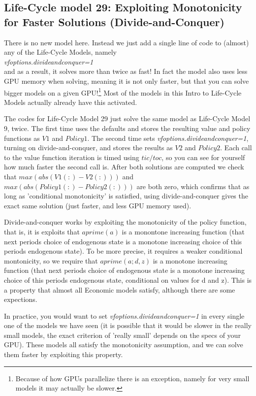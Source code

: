 \subsection{Life-Cycle model 29: Exploiting Monotonicity for Faster Solutions (Divide-and-Conquer)}
There is no new model here. Instead we just add a single line of code to (almost) any of the Life-Cycle Models, namely
\\ \textit{vfoptions.divideandconquer=1}
\\ \noindent and as a result, it solves more than twice as fast! In fact the model also uses less GPU memory when solving, meaning it is not only faster, but that you can solve bigger models on a given GPU!\footnote{Because of how GPUs parallelize there is an exception, namely for very small models it may actually be slower.} Most of the models in this Intro to Life-Cycle Models actually already have this activated.

The codes for Life-Cycle Model 29 just solve the same model as Life-Cycle Model 9, twice. The first time uses the defaults and stores the resulting value and policy functions as $V1$ and $Policy1$. The second time sets \textit{vfoptions.divideandconquer=1}, turning on divide-and-conquer, and stores the results as $V2$ and $Policy2$. Each call to the value function iteration is timed using $tic/toc$, so you can see for yourself how much faster the second call is. After both solutions are computed we check that $max(abs(V1(:)-V2(:)))$ and $max(abs(Policy1(:)-Policy2(:)))$ are both zero, which confirms that as long as 'conditional monotonicity' is satisfied, using divide-and-conquer gives the exact same solution (just faster, and less GPU memory used).

Divide-and-conquer works by exploiting the monotonicity of the policy function, that is, it is exploits that $aprime(a)$ is a monontone increasing function (that next periods choice of endogenous state is a monotone increasing choice of this periods endogenous state). To be more precise, it requires a weaker conditional montonicity, so we require that $aprime(a; d,z)$ is a monotone increasing function (that next periods choice of endogenous state is a monotone increasing choice of this periods endogenous state, conditional on values for d and z). This is a property that almost all Economic models satisfy, although there are some expections.

In practice, you would want to set \textit{vfoptions.divideandconquer=1} in every single one of the models we have seen (it is possible that it would be slower in the really small models, the exact criterion of 'really small' depends on the specs of your GPU). These models all satisfy the monotonicity assumption, and we can solve them faster by exploiting this property.

